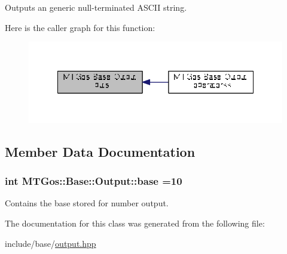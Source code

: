 Outputs an generic null-\/terminated A\+S\+C\+I\+I string. 



Here is the caller graph for this function\+:
\nopagebreak
\begin{figure}[H]
\begin{center}
\leavevmode
\includegraphics[width=348pt]{class_m_t_gos_1_1_base_1_1_output_a484df9ac6db83924c80118154f7088a1_icgraph}
\end{center}
\end{figure}




\subsection{Member Data Documentation}
\hypertarget{class_m_t_gos_1_1_base_1_1_output_a1b713f91402dd5c1fa466268fac2e439}{}
\subsubsection[{base}]{\setlength{\rightskip}{0pt plus 5cm}int M\+T\+Gos\+::\+Base\+::\+Output\+::base =10\hspace{0.3cm}{\ttfamily [private]}}\label{class_m_t_gos_1_1_base_1_1_output_a1b713f91402dd5c1fa466268fac2e439}


Contains the base stored for number output. 



The documentation for this class was generated from the following file\+:\begin{DoxyCompactItemize}
\item 
include/base/\hyperlink{output_8hpp}{output.\+hpp}\end{DoxyCompactItemize}
